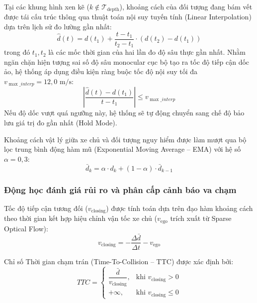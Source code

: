 Tại các khung hình xen kẽ ($k \notin \mathcal{T}_{\text{depth}}$), khoảng cách của đối tượng đang bám vết được tái cấu trúc thông qua thuật toán nội suy tuyến tính (Linear Interpolation) dựa trên lịch sử đo lường gần nhất:
\begin{equation}
\label{eq:depth_interp}
\hat{d}(t) = d(t_1) + \frac{t - t_1}{t_2 - t_1} \cdot \left( d(t_2) - d(t_1) \right)
\end{equation}
trong đó $t_1, t_2$ là các mốc thời gian của hai lần đo độ sâu thực gần nhất. Nhằm ngăn chặn hiện tượng sai số độ sâu monocular cục bộ tạo ra tốc độ tiếp cận dốc ảo, hệ thống áp dụng điều kiện ràng buộc tốc độ nội suy tối đa $v_{\max\_interp} = 12,0\text{ m/s}$:
\begin{equation}
\label{eq:depth_clamp}
\left| \frac{\hat{d}(t) - d(t_1)}{t - t_1} \right| \le v_{\max\_interp}
\end{equation}
Nếu độ dốc vượt quá ngưỡng này, hệ thống sẽ tự động chuyển sang chế độ bảo lưu giá trị đo gần nhất (Hold Mode).

Khoảng cách vật lý giữa xe chủ và đối tượng nguy hiểm được làm mượt qua bộ lọc trung bình động hàm mũ (Exponential Moving Average -- EMA) với hệ số $\alpha = 0,3$:
\begin{equation}
\label{eq:ema_distance}
\bar{d}_k = \alpha \cdot d_k + (1 - \alpha) \cdot \bar{d}_{k-1}
\end{equation}

\subsubsection{Động học đánh giá rủi ro và phân cấp cảnh báo va chạm}
Tốc độ tiếp cận tương đối ($v_{\text{closing}}$) được tính toán dựa trên đạo hàm khoảng cách theo thời gian kết hợp hiệu chỉnh vận tốc xe chủ ($v_{\text{ego}}$ trích xuất từ Sparse Optical Flow):
\begin{equation}
\label{eq:closing_speed}
v_{\text{closing}} = -\frac{\Delta \bar{d}}{\Delta t} - v_{\text{ego}}
\end{equation}

Chỉ số Thời gian chạm trán (Time-To-Collision -- TTC) được xác định bởi:
\begin{equation}
\label{eq:ttc_metric}
TTC = \begin{cases}
\dfrac{\bar{d}}{v_{\text{closing}}}, & \text{khi } v_{\text{closing}} > 0 \\
+\infty, & \text{khi } v_{\text{closing}} \le 0
\end{cases}
\end{equation}

